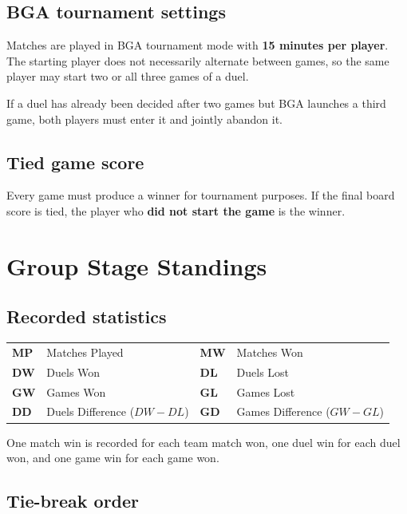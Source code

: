 \documentclass[10pt,a4paper]{article}
\newcommand{\term}[1]{\textbf{#1}}
\begin{document}
\subsection{BGA tournament settings}

Matches are played in BGA tournament mode with \term{15 minutes per player}.
The starting player does not necessarily alternate between games, so the same
player may start two or all three games of a duel.

If a duel has already been decided after two games but BGA launches a third
game, both players must enter it and jointly abandon it.

\subsection{Tied game score}

Every game must produce a winner for tournament purposes. If the final board
score is tied, the player who \term{did not start the game} is the winner.

\section{Group Stage Standings}
\label{sec:standings}

\subsection{Recorded statistics}

\begin{center}
\begin{tabularx}{\textwidth}{>{\bfseries}p{16mm}X >{\bfseries}p{16mm}X}
  \toprule
  MP & Matches Played & MW & Matches Won\\
  DW & Duels Won & DL & Duels Lost\\
  GW & Games Won & GL & Games Lost\\
  DD & Duels Difference ($DW-DL$) & GD & Games Difference ($GW-GL$)\\
  \bottomrule
\end{tabularx}
\end{center}

One match win is recorded for each team match won, one duel win for each duel
won, and one game win for each game won.

\subsection{Tie-break order}
\end{document}
